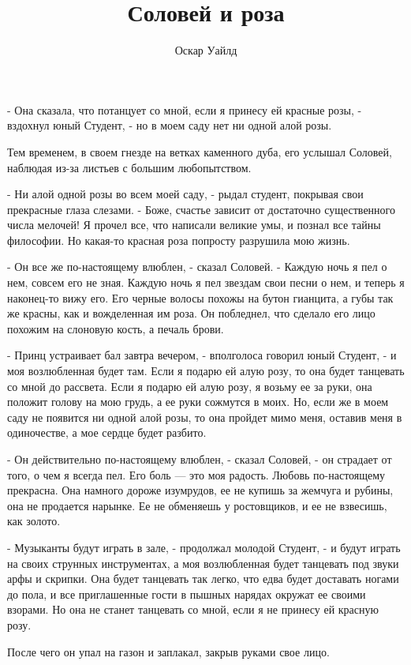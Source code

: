 \documentclass[a4paper]{article}
\date{}
\author{Оскар Уайлд}
\title{Соловей и роза}
\theoremstyle{defin}
\theoremstyle{theorem}
\theoremstyle{prop}
\theoremstyle{lemma}
\theoremstyle{ex}
\theoremstyle{col}
\begin{document}
\maketitle

- Она сказала, что потанцует со мной, если я принесу ей красные розы, - вздохнул юный Студент, - но в моем саду нет ни одной алой розы.

Тем временем, в своем гнезде на ветках каменного дуба, его услышал Соловей, наблюдая из-за листьев с большим любопытством.

- Ни алой одной розы во всем моей саду, - рыдал студент, покрывая свои прекрасные глаза слезами. - Боже, счастье зависит от достаточно существенного числа мелочей! Я прочел все, что написали великие умы, и познал все тайны философии. Но какая-то красная роза попросту разрушила мою жизнь.

- Он все же по-настоящему влюблен, - сказал Соловей. - Каждую ночь я пел о нем, совсем его не зная. Каждую ночь я пел звездам
свои песни о нем, и теперь я наконец-то вижу его. Его черные волосы похожы на бутон гианцита, а губы так же красны, как и
вожделенная им роза. Он побледнел, что сделало его лицо похожим на слоновую кость, а печаль брови.

- Принц устраивает бал завтра вечером, - вполголоса говорил юный Студент, - и моя возлюбленная будет там. Если я подарю ей алую розу, то она будет танцевать со мной до рассвета. Если я подарю ей алую розу, я возьму ее за руки, она положит голову на мою грудь, а ее руки сожмутся в моих. Но, если же в моем саду не появится ни одной алой розы, то она пройдет мимо меня, оставив меня в одиночестве, а мое сердце будет разбито.

- Он действительно по-настоящему влюблен, - сказал Соловей, - он страдает от того, о чем я всегда пел. Его боль --- это моя
радость. Любовь по-настоящему прекрасна. Она намного дороже изумрудов, ее не купишь за жемчуга и рубины, она не продается нарынке. Ее не обменяешь у ростовщиков, и ее не взвесишь, как золото.

- Музыканты будут играть в зале, - продолжал молодой Студент, - и будут играть на своих струнных инструментах, а моя возлюбленная будет танцевать под звуки арфы и скрипки. Она будет танцевать так легко, что едва будет доставать ногами до пола, и все приглашенные гости в пышных нарядах окружат ее своими взорами. Но она не станет танцевать со мной, если я не принесу ей красную розу.

После чего он упал на газон и заплакал, закрыв руками свое лицо.
\end{document}
